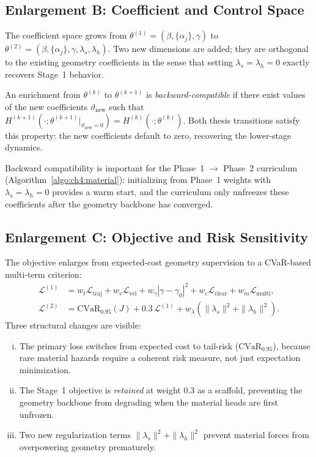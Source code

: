 \subsection{Enlargement B: Coefficient and Control Space}
\label{subsec:ch5:coeffB}

The coefficient space grows from $\theta^{(1)} = (\beta, \{\alpha_j\}, \gamma)$
to $\theta^{(2)} = (\beta, \{\alpha_j\}, \gamma, \lambda_s, \lambda_h)$.
Two new dimensions are added; they are orthogonal to the existing
geometry coefficients in the sense that setting $\lambda_s = \lambda_h = 0$
exactly recovers Stage~1 behavior.

\begin{definition}
\label{def:ch5:compat}
An enrichment from $\theta^{(k)}$ to $\theta^{(k+1)}$ is
\emph{backward-compatible} if there exist values of the new
coefficients $\vartheta_{\mathrm{new}}$ such that
$H^{(k+1)}(\cdot;\theta^{(k+1)}\big|_{\vartheta_{\mathrm{new}}=0})
= H^{(k)}(\cdot;\theta^{(k)})$.
Both thesis transitions satisfy this property: the new coefficients
default to zero, recovering the lower-stage dynamics.
\end{definition}

Backward compatibility is important for the Phase~1 $\to$ Phase~2
curriculum (Algorithm~\ref{algo:ch4:material}): initializing from
Phase~1 weights with $\lambda_s = \lambda_h = 0$ provides a warm
start, and the curriculum only unfreezes these coefficients after the
geometry backbone has converged.

\subsection{Enlargement C: Objective and Risk Sensitivity}
\label{subsec:ch5:objectiveC}

The objective enlarges from expected-cost geometry supervision to a
CVaR-based multi-term criterion:
\begin{align}
  \mathcal{L}^{(1)}
  &= w_t\mathcal{L}_{\mathrm{traj}} + w_v\mathcal{L}_{\mathrm{vel}}
     + w_\gamma|\gamma-\gamma_0|^2 + w_c\mathcal{L}_{\mathrm{clear}}
     + w_m\mathcal{L}_{\mathrm{multi}},
  \label{eq:ch5:L1} \\
  \mathcal{L}^{(2)}
  &= \mathrm{CVaR}_{0.95}(J)
     + 0.3\,\mathcal{L}^{(1)}
     + w_\lambda(\|\lambda_s\|^2 + \|\lambda_h\|^2).
  \label{eq:ch5:L2}
\end{align}
Three structural changes are visible:
\begin{enumerate}[(i)]
  \item The primary loss switches from expected cost to tail-risk
        ($\mathrm{CVaR}_{0.95}$), because rare material hazards require
        a coherent risk measure, not just expectation minimization.
  \item The Stage~1 objective is \emph{retained} at weight $0.3$ as
        a scaffold, preventing the geometry backbone from degrading
        when the material heads are first unfrozen.
  \item Two new regularization terms $\|\lambda_s\|^2 + \|\lambda_h\|^2$
        prevent material forces from overpowering geometry prematurely.
\end{enumerate}

